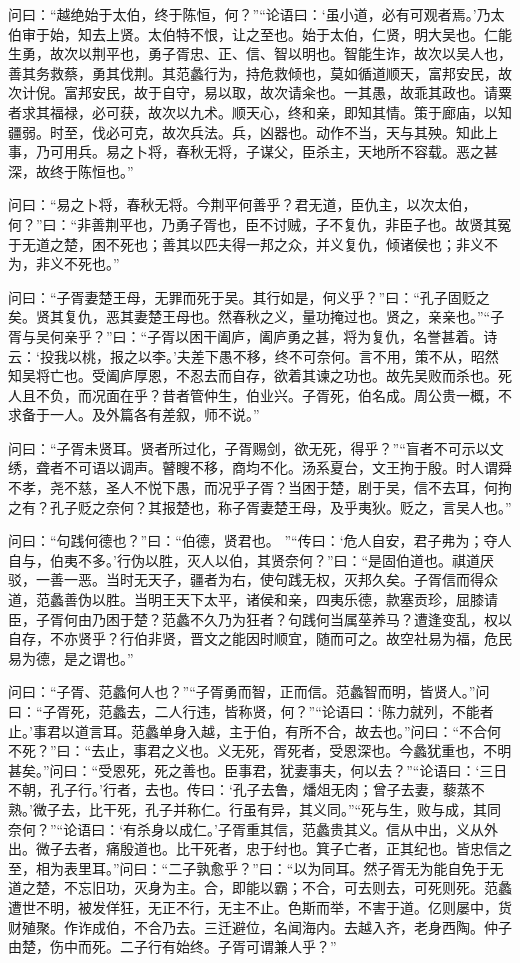 \documentclass[12pt,UTF8]{ctexbook}
\begin{document}
问曰：“越绝始于太伯，终于陈恒，何？”“论语曰：‘虽小道，必有可观者焉。’乃太伯审于始，知去上贤。太伯特不恨，让之至也。始于太伯，仁贤，明大吴也。仁能生勇，故次以荆平也，勇子胥忠、正、信、智以明也。智能生诈，故次以吴人也，善其务救蔡，勇其伐荆。其范蠡行为，持危救倾也，莫如循道顺天，富邦安民，故次计倪。富邦安民，故于自守，易以取，故次请籴也。一其愚，故乖其政也。请粟者求其福禄，必可获，故次以九术。顺天心，终和亲，即知其情。策于廊庙，以知疆弱。时至，伐必可克，故次兵法。兵，凶器也。动作不当，天与其殃。知此上事，乃可用兵。易之卜将，春秋无将，子谋父，臣杀主，天地所不容载。恶之甚深，故终于陈恒也。”

问曰：“易之卜将，春秋无将。今荆平何善乎？君无道，臣仇主，以次太伯，何？”曰：“非善荆平也，乃勇子胥也，臣不讨贼，子不复仇，非臣子也。故贤其冤于无道之楚，困不死也；善其以匹夫得一邦之众，并义复仇，倾诸侯也；非义不为，非义不死也。”

问曰：“子胥妻楚王母，无罪而死于吴。其行如是，何义乎？”曰：“孔子固贬之矣。贤其复仇，恶其妻楚王母也。然春秋之义，量功掩过也。贤之，亲亲也。”“子胥与吴何亲乎？”曰：“子胥以困干阖庐，阖庐勇之甚，将为复仇，名誉甚着。诗云：‘投我以桃，报之以李。’夫差下愚不移，终不可奈何。言不用，策不从，昭然知吴将亡也。受阖庐厚恩，不忍去而自存，欲着其谏之功也。故先吴败而杀也。死人且不负，而况面在乎？昔者管仲生，伯业兴。子胥死，伯名成。周公贵一概，不求备于一人。及外篇各有差叙，师不说。”

问曰：“子胥未贤耳。贤者所过化，子胥赐剑，欲无死，得乎？”“盲者不可示以文绣，聋者不可语以调声。瞽瞍不移，商均不化。汤系夏台，文王拘于殷。时人谓舜不孝，尧不慈，圣人不悦下愚，而况乎子胥？当困于楚，剧于吴，信不去耳，何拘之有？孔子贬之奈何？其报楚也，称子胥妻楚王母，及乎夷狄。贬之，言吴人也。”

问曰：“句践何德也？”曰：“伯德，贤君也。 ”“传曰：‘危人自安，君子弗为；夺人自与，伯夷不多。’行伪以胜，灭人以伯，其贤奈何？”曰：“是固伯道也。祺道厌驳，一善一恶。当时无天子，疆者为右，使句践无权，灭邦久矣。子胥信而得众道，范蠡善伪以胜。当明王天下太平，诸侯和亲，四夷乐德，款塞贡珍，屈膝请臣，子胥何由乃困于楚？范蠡不久乃为狂者？句践何当属莝养马？遭逢变乱，权以自存，不亦贤乎？行伯非贤，晋文之能因时顺宜，随而可之。故空社易为福，危民易为德，是之谓也。”

问曰：“子胥、范蠡何人也？”“子胥勇而智，正而信。范蠡智而明，皆贤人。”问曰：“子胥死，范蠡去，二人行违，皆称贤，何？”“论语曰：‘陈力就列，不能者止。’事君以道言耳。范蠡单身入越，主于伯，有所不合，故去也。”问曰：“不合何不死？”曰：“去止，事君之义也。义无死，胥死者，受恩深也。今蠡犹重也，不明甚矣。”问曰：“受恩死，死之善也。臣事君，犹妻事夫，何以去？”“论语曰：‘三日不朝，孔子行。’行者，去也。传曰：‘孔子去鲁，燔俎无肉；曾子去妻，藜蒸不熟。’微子去，比干死，孔子并称仁。行虽有异，其义同。”“死与生，败与成，其同奈何？”“论语曰：‘有杀身以成仁。’子胥重其信，范蠡贵其义。信从中出，义从外出。微子去者，痛殷道也。比干死者，忠于纣也。箕子亡者，正其纪也。皆忠信之至，相为表里耳。”问曰：“二子孰愈乎？”曰：“以为同耳。然子胥无为能自免于无道之楚，不忘旧功，灭身为主。合，即能以霸；不合，可去则去，可死则死。范蠡遭世不明，被发佯狂，无正不行，无主不止。色斯而举，不害于道。亿则屡中，货财殖聚。作诈成伯，不合乃去。三迁避位，名闻海内。去越入齐，老身西陶。仲子由楚，伤中而死。二子行有始终。子胥可谓兼人乎？”
\end{document}
